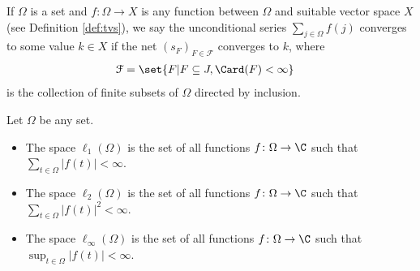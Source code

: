 \begin{definition}
  If $\Omega$ is a set and $f\colon \Omega\rightarrow X$ is any function between $\Omega$ and suitable vector space $X$ (see Definition \ref{def:tvs}), we say the unconditional series $\sum_{j\in\Omega}f(j)$ converges to some value $k\in X$ if the net $\left(s_{F}\right)_{F\in \mathcal{F}}$ converges to $k$, where
  \begin{align*}
    \mathcal{F} &= \set{F | F\subseteq J,\Card(F) < \infty}
  \end{align*}
  is the collection of finite subsets of $\Omega$ directed by inclusion.
\end{definition}
\begin{definition}\label{def:three_function_spaces}
  Let $\Omega$ be any set.
  \begin{itemize}
    \item The space $\ell_{1}(\Omega)$ is the set of all functions $f\colon \Omega\rightarrow \C$ such that $\displaystyle \sum_{t\in\Omega}\left\vert f(t) \right\vert < \infty$.
    \item The space $\ell_{2}(\Omega)$ is the set of all functions $f\colon \Omega\rightarrow \C$ such that $\displaystyle \sum_{t\in\Omega}\left\vert f(t) \right\vert^2 < \infty$.
    \item The space $\ell_{\infty}(\Omega)$ is the set of all functions $f\colon \Omega\rightarrow \C$ such that $\sup_{t\in\Omega}\left\vert f(t) \right\vert < \infty$.
  \end{itemize}
\end{definition}

